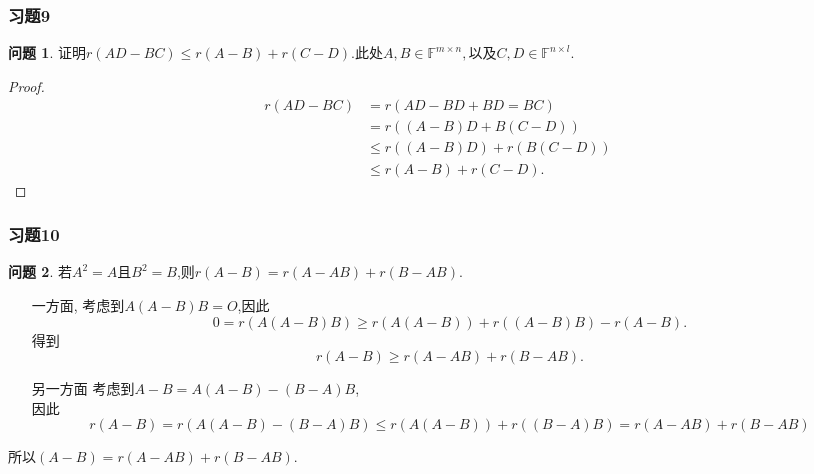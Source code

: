 \documentclass[11pt]{ctexart}
\theoremstyle{definition}
\newtheorem{qqq}{问题}[section]
\numberwithin{equation}{section}
\begin{document}
\subsubsection{习题9}
\begin{qqq}
    证明$r(AD-BC)\leq r(A-B)+r(C-D).$此处$A,B\in \mathbb{F}^{m\times n},$以及$C,D\in \mathbb{F}^{n\times l}$.
\end{qqq}
\begin{proof}
    \begin{align*}
        r(AD-BC)&=r(AD-BD+BD=BC)\\
        &=r((A-B)D+B(C-D))\\
        &\leq r((A-B)D)+r(B(C-D))\\
        &\leq r(A-B)+r(C-D).
    \end{align*}
\end{proof}
\subsubsection{习题10}
\begin{qqq}
    若$A^2=A$且$B^2=B$,则$r(A-B)=r(A-AB)+r(B-AB)$.
\end{qqq}
\begin{aaa}
    \begin{itemize}
        \item [一方面,]考虑到$A(A-B)B=O$,因此$$0=r(A(A-B)B)\geq r(A(A-B))+r((A-B)B)-r(A-B).$$得到$$r(A-B)\geq r(A-AB)+r(B-AB).$$
        \item [另一方面]考虑到$A-B=A(A-B)-(B-A)B$,\\因此$$r(A-B)=r(A(A-B)-(B-A)B)\leq r(A(A-B))+r((B-A)B)= r(A-AB)+r(B-AB)$$
    \end{itemize}
    所以$(A-B)=r(A-AB)+r(B-AB)$.
\end{aaa}
\end{document}

